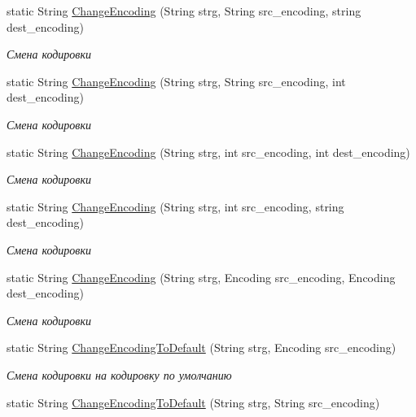 \begin{DoxyCompactItemize}
static String \hyperlink{class_common_objects_1_1_common_a12f8f3c8797f7f21e171a51efbcbb89a}{ChangeEncoding} (String strg, String src\_\-encoding, string dest\_\-encoding)
\begin{DoxyCompactList}\small\item\em Смена кодировки \item\end{DoxyCompactList}\item 
static String \hyperlink{class_common_objects_1_1_common_a1a4fae5cc5660e3fd64d66d452ba3417}{ChangeEncoding} (String strg, String src\_\-encoding, int dest\_\-encoding)
\begin{DoxyCompactList}\small\item\em Смена кодировки \item\end{DoxyCompactList}\item 
static String \hyperlink{class_common_objects_1_1_common_af2523640eaebcf44c9046a0e4958d05d}{ChangeEncoding} (String strg, int src\_\-encoding, int dest\_\-encoding)
\begin{DoxyCompactList}\small\item\em Смена кодировки \item\end{DoxyCompactList}\item 
static String \hyperlink{class_common_objects_1_1_common_a4e7f36a9b9b35e7fad3419bedb55f323}{ChangeEncoding} (String strg, int src\_\-encoding, string dest\_\-encoding)
\begin{DoxyCompactList}\small\item\em Смена кодировки \item\end{DoxyCompactList}\item 
static String \hyperlink{class_common_objects_1_1_common_a4f95e91fcf6000d3f2e99bc7242f33a3}{ChangeEncoding} (String strg, Encoding src\_\-encoding, Encoding dest\_\-encoding)
\begin{DoxyCompactList}\small\item\em Смена кодировки \item\end{DoxyCompactList}\item 
static String \hyperlink{class_common_objects_1_1_common_a28b60d18f941169565d19ad3703617ca}{ChangeEncodingToDefault} (String strg, Encoding src\_\-encoding)
\begin{DoxyCompactList}\small\item\em Смена кодировки на кодировку по умолчанию \item\end{DoxyCompactList}\item 
static String \hyperlink{class_common_objects_1_1_common_a0a0adffdc8c0ad502be63e291570cd7c}{ChangeEncodingToDefault} (String strg, String src\_\-encoding)
\end{DoxyCompactItemize}



